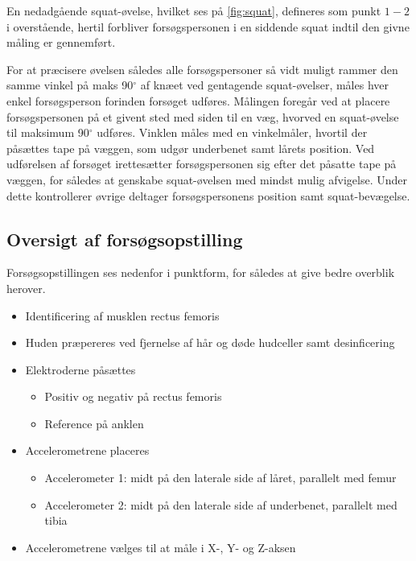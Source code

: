 En nedadgående squat-øvelse, hvilket ses på \autoref{fig:squat}, defineres som punkt $1-2$ i overstående, hertil forbliver forsøgspersonen i en siddende squat indtil den givne måling er gennemført.

For at præcisere øvelsen således alle forsøgspersoner så vidt muligt rammer den samme vinkel på maks  90$^{\circ}$ af knæet ved gentagende squat-øvelser, måles hver enkel forsøgsperson forinden forsøget udføres. Målingen foregår ved at placere forsøgspersonen på et givent sted med siden til en væg, hvorved en squat-øvelse til maksimum 90$^{\circ}$ udføres. Vinklen måles med en vinkelmåler, hvortil der påsættes tape på væggen, som udgør underbenet samt lårets position.
Ved udførelsen af forsøget irettesætter forsøgspersonen sig efter det påsatte tape på væggen, for således at genskabe squat-øvelsen med mindst mulig afvigelse. Under dette kontrollerer øvrige deltager forsøgspersonens position samt squat-bevægelse.



\subsection{Oversigt af forsøgsopstilling}
Forsøgsopstillingen ses nedenfor i punktform, for således at give bedre overblik herover. 

\begin{itemize}
\item Identificering af musklen rectus femoris %
\item Huden præpereres ved fjernelse af hår og døde hudceller samt desinficering 
\item Elektroderne påsættes
	\begin{itemize}
	\item Positiv og negativ på rectus femoris
	\item Reference på anklen
	\end{itemize} 
\item Accelerometrene placeres 
	\begin{itemize}
	\item Accelerometer 1: midt på den laterale side af låret, parallelt med femur
	\item Accelerometer 2: midt på den laterale side af underbenet, parallelt med tibia 
	\end{itemize}
\item Accelerometrene vælges til at måle i X-, Y- og Z-aksen
\end{itemize}

